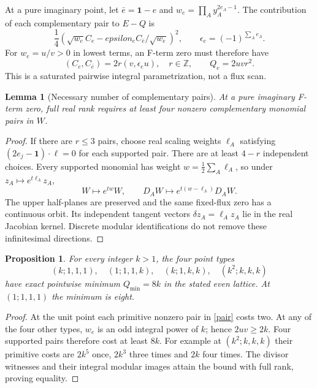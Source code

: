 \documentclass[11pt]{article}
\newtheorem{lemma}{Lemma}
\newtheorem{proposition}{Proposition}
\newcommand{\Z}{\mathbb Z}
\begin{document}
At a pure imaginary point, let $\bar e=\mathbf1-e$ and
$w_e=\prod_Ay_A^{2e_A-1}$. The contribution of each complementary pair to
$E-Q$ is
\begin{equation}
\frac14\left(\sqrt{w_e}C_e-epsilon_eC_{\bar e}/\sqrt{w_e}\right)^2,
\qquad\epsilon_e=(-1)^{\sum_Ae_A}.
\end{equation}
For $w_e=u/v>0$ in lowest terms, an F-term zero must therefore have
\begin{equation}
(C_e,C_{\bar e})=2r(v,\epsilon_eu),\quad r\in\Z,
\qquad Q_e=2uvr^2.
\label{pair}
\end{equation}
This is a saturated pairwise integral parametrization, not a flux scan.

\begin{lemma}[Necessary number of complementary pairs]
At a pure imaginary F-term zero, full real rank requires at least four
nonzero complementary monomial pairs in $W$.
\end{lemma}
\begin{proof}
If there are $r\le3$ pairs, choose real scaling weights $\ell_A$ satisfying
$(2e_j-\mathbf1)\cdot\ell=0$ for each supported pair. There are at least
$4-r$ independent choices. Every supported monomial has weight
$w=\frac12\sum_A\ell_A$, so under $z_A\mapsto e^{t\ell_A}z_A$,
\begin{equation}
W\mapsto e^{tw}W,\qquad D_AW\mapsto e^{t(w-\ell_A)}D_AW.
\end{equation}
The upper half-planes are preserved and the same fixed-flux zero has a
continuous orbit. Its independent tangent vectors $\delta z_A=\ell_Az_A$
lie in the real Jacobian kernel. Discrete modular identifications do not
remove these infinitesimal directions.
\end{proof}

\begin{proposition}
For every integer $k>1$, the four point types
\begin{equation}
(k;1,1,1),\quad(1;1,1,k),\quad(k;1,k,k),\quad(k^2;k,k,k)
\end{equation}
have exact pointwise minimum $Q_{\min}=8k$ in the stated even lattice.
At $(1;1,1,1)$ the minimum is eight.
\end{proposition}
\begin{proof}
At the unit point each primitive nonzero pair in \eqref{pair} costs two.
At any of the four other types, $w_e$ is an odd integral power of $k$;
hence $2uv\ge2k$. Four supported pairs therefore cost at least $8k$.
For example at $(k^2;k,k,k)$ their primitive costs are $2k^5$ once,
$2k^3$ three times and $2k$ four times. The divisor witnesses and their
integral modular images attain the bound with full rank, proving equality.
\end{proof}
\end{document}
